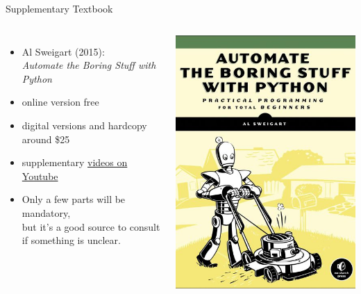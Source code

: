 \documentclass[professionalfonts, xcolor={usenames,svgnames,x11names,table}]{beamer}
\begin{document}
\begin{frame}{Supplementary Textbook}
    \begin{columns}
            \begin{itemize}
                \item Al Sweigart (2015):\\
                      \emph{Automate the Boring Stuff with Python}
                \item online version free
                \item digital versions and hardcopy around \$25
                \item supplementary \href{https://www.youtube.com/playlist?list=PLGoJzB271_7r-iLYuEHEPJ5pSIYxXjJEn}{videos on Youtube}
                \item Only a few parts will be mandatory,\\
                      but it's a good source to consult if something is unclear.
            \end{itemize}

            \includegraphics[width=.9\linewidth]{./img/textbook}
    \end{columns}
\end{frame}
\end{document}

